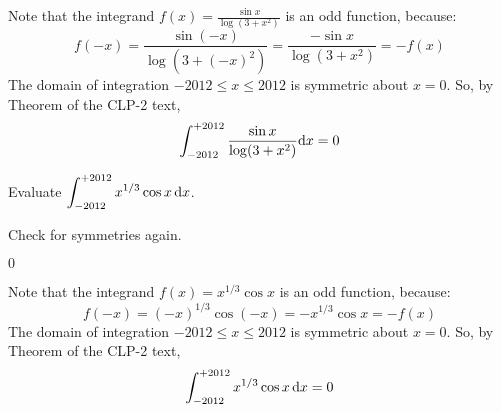 \begin{solution}
Note that the integrand $f(x) = \frac{\sin x}{\log(3+x^2)}$ is an odd function, because:
\begin{equation*}
f(-x) = \frac{\sin(-x)}{\log(3+(-x)^2)}=\frac{-\sin x}{\log(3+x^2)} =- f(x)
\end{equation*}
The domain of integration $-2012 \le x \le 2012$ is symmetric about $x=0$. So,
by Theorem  of the CLP-2 text,
\begin{equation*}
\int_{-2012}^{+2012} \frac{\sin x}{\log(3+x^2)}\mathrm{d}x = 0
\end{equation*}
\end{solution}

\begin{question}[2012A]
Evaluate $\displaystyle\int_{-2012}^{+2012} x^{1/3}\cos x\,\mathrm{d}x$.
\end{question}

\begin{hint}
Check for symmetries again.
\end{hint}

\begin{answer}
$0$
\end{answer}

\begin{solution}
Note that the integrand $f(x) = x^{1/3}\cos x$ is an odd function,
because:
\begin{equation*}
f(-x) = (-x)^{1/3}\cos(-x)= - x^{1/3}\cos x =- f(x)
\end{equation*}
The domain of integration $-2012 \le x \le 2012$ is symmetric about $x=0$. So,
by Theorem  of the CLP-2 text,
\begin{equation*}
\int_{-2012}^{+2012}x^{1/3}\cos x\,\mathrm{d}x = 0
\end{equation*}
\end{solution}

